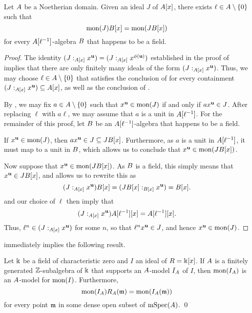\documentclass{article}
\begin{document}
\begin{theorem}
\label{mon-operation-general-expansion: T}
Let $A$ be a Noetherian domain.  Given an ideal $J$ of $A[x]$, there exists $\ell \in A \setminus \{0\}$ such that 
\[ \operatorname{mon}(J) B[x] = \operatorname{mon}(J B[x])\]
for every $A[\ell^{-1}]$-algebra $B$ {that happens to be a field}.
\end{theorem}

\begin{proof}
   The identity $(J:_{A[x]} x^{\mathbf{u}}) = (J:_{A[x]} x^{\phi(\mathbf{u})})$ established in the proof of  implies that there are only finitely many ideals of the form $(J:_{A[x]} x^{\mathbf{u}})$.
   Thus, we may choose $\ell \in A\setminus \{0\}$ that satisfies the conclusion of  for every containment $(J:_{A[x]} x^{\mathbf{u}}) \subseteq A[x]$, as well as the conclusion of .

   By , we may fix $a \in A \setminus \{0\}$ such that $x^{\mathbf{u}} \in \operatorname{mon}(J)$ if and only if $ax^{\mathbf{u}} \in J$.
   After replacing $\ell$ with $a \ell$, we may assume that $a$ is a unit in $A[\ell^{-1}]$.
   For the remainder of this proof, let $B$ be an $A[\ell^{-1}]$-algebra that happens to be a field.

   If $x^{\mathbf{u}} \in \operatorname{mon}(J)$, then $a x^{\mathbf{u}} \in J \subseteq J B[x]$.
   Furthermore, as $a$ is a unit in $A[\ell^{-1}]$, it must map to a unit in $B$, which allows us to conclude that $x^{\mathbf{u}} \in \operatorname{mon}(J B[x])$.

   Now suppose that $x^{\mathbf{u}} \in \operatorname{mon}(J B[x])$.
   As $B$ is a field, this simply means that $x^{\mathbf{u}} \in J B[x]$, and  allows us to rewrite this as
   \[(J:_{A[x]} x^{\mathbf{u}}) B[x] = (J B[x] :_{B[x]} x^{\mathbf{u}}) = B[x].\]
    and our choice of $\ell$ then imply that \[(J:_{A[x]} x^{\mathbf{u}}) A[\ell^{-1}][x] = A[\ell^{-1}][x].\]
   Thus, $\ell^n \in (J:_{A[x]} x^{\mathbf{u}})$ for some $n$, so that $\ell^n x^{\mathbf{u}} \in J$, and hence $x^{\mathbf{u}} \in \operatorname{mon}(J)$.
\end{proof}

 immediately implies the following result.

\begin{theorem}
   \label{mon-operation-modulo-p: T}
   Let $\Bbbk$ be a field of characteristic zero and $I$ an ideal of $R=\Bbbk[x]$.
   If $A$ is a finitely generated $\mathbb{Z}$-subalgebra of $\Bbbk$ that supports an $A$-model $I_A$ of $I$, then $\operatorname{mon}(I_A)$ is an $A$-model for $\operatorname{mon}(I)$.
   Furthermore,
   \[ \operatorname{mon}(I_A) R_A(\mathfrak{m}) = \operatorname{mon}(I_A(\mathfrak{m})) \]
   for every point $\mathfrak{m}$ in some dense open subset of $\operatorname{mSpec}(A)$. \qed
\end{theorem}
\end{document}
